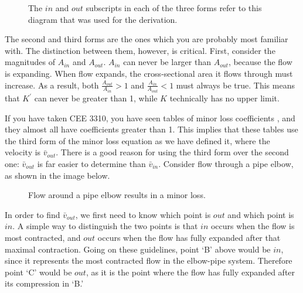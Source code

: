 \documentclass[letterpaper,10pt,english]{sphinxmanual}
\let\sphinxpxdimen\pdfpxdimen\else\newdimen\sphinxpxdimen
\begin{document}
\begin{figure}[htbp]
\centering
\capstart

\noindent\sphinxincludegraphics[width=650\sphinxpxdimen]{{minor_loss_pipe}.png}
\caption{The \(in\) and \(out\) subscripts in each of the three forms refer to this diagram that was used for the derivation.}\label{\detokenize{Fluids_Review/Fluids_Review_Design:id18}}\label{\detokenize{Fluids_Review/Fluids_Review_Design:minor-loss-pipe-frd}}\end{figure}

The second and third forms are the ones which you are probably most familiar with. The distinction between them, however, is critical. First, consider the magnitudes of \(A_{in}\) and \(A_{out}\). \(A_{in}\) can never be larger than \(A_{out}\), because the flow is expanding. When flow expands, the cross-sectional area it flows through must increase. As a result, both \(\frac{A_{out}}{A_{in}} > 1\) and \(\frac{A_{in}}{A_{out}} < 1\) must always be true. This means that \(K^{'}\) can never be greater than 1, while \(K\) technically has no upper limit.

If you have taken CEE 3310, you have seen tables of minor loss coefficients , and they almost all have coefficients greater than 1. This implies that these tables use the third form of the minor loss equation as we have defined it, where the velocity is \(\bar v_{out}\). There is a good reason for using the third form over the second one: \(\bar v_{out}\) is far easier to determine than \(\bar v_{in}\). Consider flow through a pipe elbow, as shown in the image below.

\begin{figure}[htbp]
\centering
\capstart

\noindent\sphinxincludegraphics[width=650\sphinxpxdimen]{{minor_loss_elbow}.png}
\caption{Flow around a pipe elbow results in a minor loss.}\label{\detokenize{Fluids_Review/Fluids_Review_Design:id19}}\label{\detokenize{Fluids_Review/Fluids_Review_Design:minor-loss-elbow}}\end{figure}

In order to find \(\bar v_{out}\), we first need to know which point is \(out\) and which point is \(in\). A simple way to distinguish the two points is that \(in\) occurs when the flow is most contracted, and \(out\) occurs when the flow has fully expanded after that maximal contraction. Going on these guidelines, point ‘B’ above would be \(in\), since it represents the most contracted flow in the elbow-pipe system. Therefore point ‘C’ would be \(out\), as it is the point where the flow has fully expanded after its compression in ‘B.’
\end{document}
